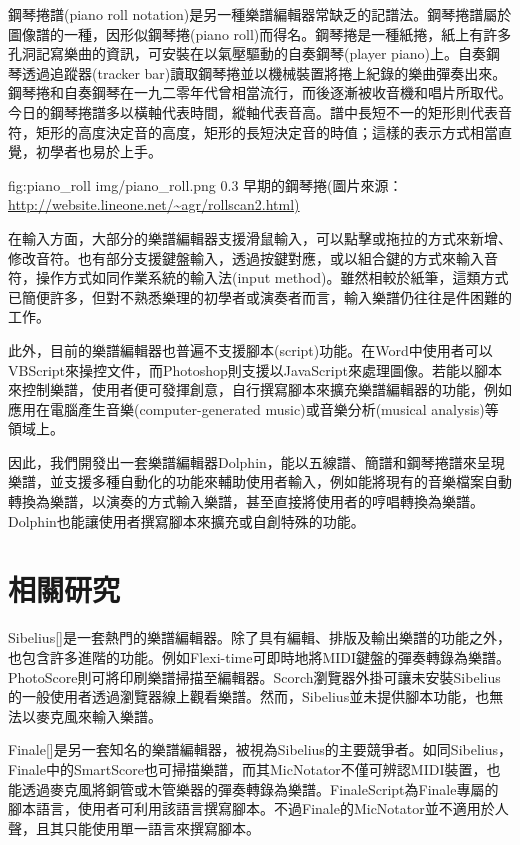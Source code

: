 \documentclass[12pt,a4paper,oneside]{report}
\begin{document}
鋼琴捲譜(piano roll notation)是另一種樂譜編輯器常缺乏的記譜法。鋼琴捲譜屬於圖像譜的一種，因形似鋼琴捲(piano roll)而得名。鋼琴捲是一種紙捲，紙上有許多孔洞記寫樂曲的資訊，可安裝在以氣壓驅動的自奏鋼琴(player piano)上。自奏鋼琴透過追蹤器(tracker bar)讀取鋼琴捲並以機械裝置將捲上紀錄的樂曲彈奏出來。鋼琴捲和自奏鋼琴在一九二零年代曾相當流行，而後逐漸被收音機和唱片所取代\cite{thePiano}。今日的鋼琴捲譜多以橫軸代表時間，縱軸代表音高。譜中長短不一的矩形則代表音符，矩形的高度決定音的高度，矩形的長短決定音的時值；這樣的表示方式相當直覺，初學者也易於上手。

\figurewithcaption
{fig:piano_roll}
{img/piano_roll.png}
{0.3}
{早期的鋼琴捲(圖片來源：\url{http://website.lineone.net/~agr/rollscan2.html)}}

在輸入方面，大部分的樂譜編輯器支援滑鼠輸入，可以點擊或拖拉的方式來新增、修改音符。也有部分支援鍵盤輸入，透過按鍵對應，或以組合鍵的方式來輸入音符，操作方式如同作業系統的輸入法(input method)。雖然相較於紙筆，這類方式已簡便許多，但對不熟悉樂理的初學者或演奏者而言，輸入樂譜仍往往是件困難的工作。

此外，目前的樂譜編輯器也普遍不支援腳本(script)功能。在Word中使用者可以VBScript來操控文件，而Photoshop則支援以JavaScript來處理圖像。若能以腳本來控制樂譜，使用者便可發揮創意，自行撰寫腳本來擴充樂譜編輯器的功能，例如應用在電腦產生音樂(computer-generated music)或音樂分析(musical analysis)等領域上。

因此，我們開發出一套樂譜編輯器Dolphin，能以五線譜、簡譜和鋼琴捲譜來呈現樂譜，並支援多種自動化的功能來輔助使用者輸入，例如能將現有的音樂檔案自動轉換為樂譜，以演奏的方式輸入樂譜，甚至直接將使用者的哼唱轉換為樂譜。Dolphin也能讓使用者撰寫腳本來擴充或自創特殊的功能。

\section{相關研究} %

Sibelius[]是一套熱門的樂譜編輯器。除了具有編輯、排版及輸出樂譜的功能之外，也包含許多進階的功能。例如Flexi-time可即時地將MIDI鍵盤的彈奏轉錄為樂譜。PhotoScore則可將印刷樂譜掃描至編輯器。Scorch瀏覽器外掛可讓未安裝Sibelius的一般使用者透過瀏覽器線上觀看樂譜。然而，Sibelius並未提供腳本功能，也無法以麥克風來輸入樂譜。

Finale[]是另一套知名的樂譜編輯器，被視為Sibelius的主要競爭者。如同Sibelius，Finale中的SmartScore也可掃描樂譜，而其MicNotator不僅可辨認MIDI裝置，也能透過麥克風將銅管或木管樂器的彈奏轉錄為樂譜。FinaleScript為Finale專屬的腳本語言，使用者可利用該語言撰寫腳本。不過Finale的MicNotator並不適用於人聲，且其只能使用單一語言來撰寫腳本。
\end{document}
